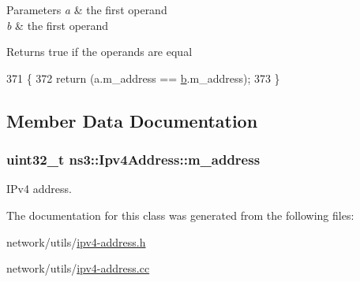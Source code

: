 \begin{DoxyParams}{Parameters}
{\em a} & the first operand \\
\hline
{\em b} & the first operand \\
\hline
\end{DoxyParams}
\begin{DoxyReturn}{Returns}
true if the operands are equal 
\end{DoxyReturn}

\begin{DoxyCode}
371 \{
372   \textcolor{keywordflow}{return} (a.m\_address == \hyperlink{buildings__pathloss_8m_a21ad0bd836b90d08f4cf640b4c298e7c}{b}.m\_address);
373 \}
\end{DoxyCode}


\subsection{Member Data Documentation}
\subsubsection[{\texorpdfstring{m\+\_\+address}{m_address}}]{\setlength{\rightskip}{0pt plus 5cm}uint32\+\_\+t ns3\+::\+Ipv4\+Address\+::m\+\_\+address\hspace{0.3cm}{\ttfamily [private]}}\hypertarget{classns3_1_1Ipv4Address_add9fdbe24355d724a2598c4b201d31fb}{}\label{classns3_1_1Ipv4Address_add9fdbe24355d724a2598c4b201d31fb}


I\+Pv4 address. 



The documentation for this class was generated from the following files\+:\begin{DoxyCompactItemize}
\item 
network/utils/\hyperlink{ipv4-address_8h}{ipv4-\/address.\+h}\item 
network/utils/\hyperlink{ipv4-address_8cc}{ipv4-\/address.\+cc}\end{DoxyCompactItemize}
